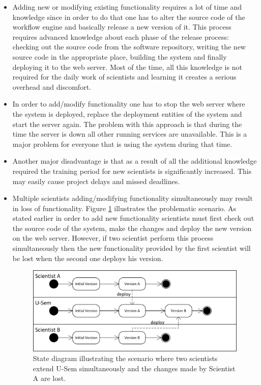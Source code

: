 \begin{itemize}

	\item Adding new or modifying existing functionality requires a lot of time and knowledge since in order to do that one has to alter the source code of the workflow engine and basically release a new version of it. This process requires advanced knowledge about each phase of the release process: checking out the source code from the software repository, writing the new source code in the appropriate place, building the system and finally deploying it to the web server. Most of the time, all this knowledge is not required for the daily work of scientists and learning it creates a serious overhead and discomfort.
	
	\item In order to add/modify functionality one has to stop the web server where the system is deployed, replace the deployment entities of the system and start the server again. The problem with this approach is that during the time the server is down all other running services are unavailable. This is a major problem for everyone that is using the system during that time.
	
	\item Another major disadvantage is that as a result of all the additional knowledge required the training period for new scientists is significantly increased. This may easily cause project delays and missed deadlines.
	
	\item Multiple scientists adding/modifying functionality simultaneously may result in loss of functionality. Figure \ref{fig_vers_prob} illustrates the problematic scenario. As stated earlier in order to add new functionality scientists must first check out the source code of the system, make the changes and deploy the new version on the web server. However, if two scientist perform this process simultaneously then the new functionality provided by the first scientist will be lost when the second one deploys his version. 
	
	\begin{figure}[h!]
  \centering
  	\includegraphics[scale=0.75]{plug-in/version_problem.png}
  \caption{State diagram illustrating the scenario where two scientists extend U-Sem simultaneously and the changes made by Scientist A are lost.  }
  \label{fig_vers_prob}
\end{figure}
	

\end{itemize}
